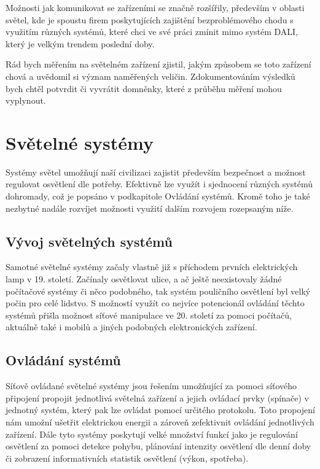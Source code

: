 \documentclass[FM,RP]{tulthesis}
\begin{document}
Možnosti jak komunikovat se zařízeními se značně rozšířily, především v oblasti světel, kde je spoustu firem poskytujících zajištění bezproblémového chodu s využitím různých systémů, které chci ve své práci zmínit mimo systém DALI,  který je velkým trendem poslední doby.

Rád bych měřením na světelném zařízení zjistil, jakým způsobem se toto zařízení chová a uvědomil si význam naměřených veličin. Zdokumentováním výsledků bych chtěl potvrdit či vyvrátit domněnky, které z průběhu měření mohou vyplynout.

 
 \chapter {Světelné systémy}
Systémy světel umožňují naší civilizaci zajistit především bezpečnost a možnost regulovat osvětlení dle potřeby. Efektivně lze využít i sjednocení různých systémů dohromady, což je popsáno v podkapitole Ovládání systémů. Kromě toho je také nezbytné nadále rozvíjet možnosti využití dalším rozvojem rozepsaným níže.  
 
 \section{Vývoj světelných systémů}
 Samotné světelné systémy začaly vlastně již s příchodem prvních elektrických lamp v 19. století. Začínaly osvětlovat ulice, a ač ještě neexistovaly žádné počítačové systémy či něco podobného, tak systém pouličního osvětlení byl velký počin pro celé lidstvo. S možností využít co nejvíce potencionál ovládání těchto systémů přišla možnost síťové manipulace ve 20. století za pomoci počítačů, aktuálně také i mobilů a jiných podobných elektronických zařízení.
 \section {Ovládání systémů}
 Síťově ovládané světelné systémy jsou řešením umožňující za pomoci síťového připojení propojit jednotlivá světelná zařízení a jejich ovládací prvky (spínače) v jednotný systém, který pak lze ovládat pomocí určitého protokolu. Toto propojení nám umožní ušetřit elektrickou energii a zároveň zefektivnit ovládání jednotlivých zařízení. Dále tyto systémy poskytují velké množství funkcí jako je regulování osvětlení za pomoci detekce pohybu, plánování intenzity osvětlení dle denní doby či zobrazení informativních statistik osvětlení (výkon, spotřeba).  
 \cite{daintree.net}
 \cite{wiki:Lighting_control_system}
 \newpage
\end{document}
